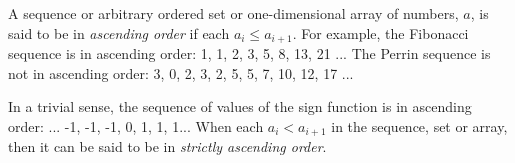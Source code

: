 \documentclass[12pt]{article}
\begin{document}
A sequence or arbitrary ordered set or one-dimensional array of numbers, $a$, is said to be in {\em ascending order} if each $a_i \le a_{i + 1}$. For example, the Fibonacci sequence is in ascending order: 1, 1, 2, 3, 5, 8, 13, 21 ... The Perrin sequence is not in ascending order: 3, 0, 2, 3, 2, 5, 5, 7, 10, 12, 17 ...

In a trivial sense, the sequence of values of the sign function is in ascending order: ... -1, -1, -1, 0, 1, 1, 1... When each $a_i < a_{i + 1}$ in the sequence, set or array, then it can be said to be in {\em strictly ascending order}.
\end{document}
